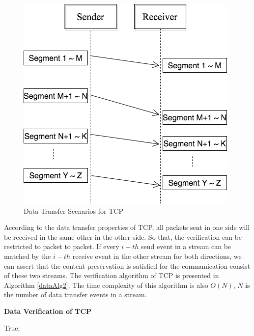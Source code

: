 \begin{figure}[H]
\centerline{\includegraphics[scale=0.4]{Figures/tcp}}
 \caption{Data Transfer Scenarios for TCP}
\label{tcp}
\end{figure}

According to the data transfer properties of TCP, all packets sent in one side will be received in the same other in the other side. So that, the verification can be restricted to packet to packet. If every $i-th$ send event in a stream can be matched by the $i-th$ receive event in the other stream for both directions, we can assert that the content preservation is satisfied for the communication consist of these two streams. The verification algorithm of TCP is presented in Algorithm \ref{dataAlg2}. The time complexity of this algorithm is also $O(N)$, $N$ is the number of data transfer events in a stream.

\begin{algorithm}[H]
\DontPrintSemicolon
\caption{{\bf Data Verification of TCP} \label{dataAlg2}}
\;
 \KwRet True;\;
\end{algorithm} 



